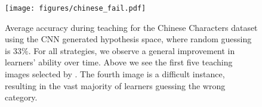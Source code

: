 \documentclass[../main.tex]{subfiles}
\begin{document}
\begin{figure}[h]
    \centering
    \texttt{[image: figures/chinese\_fail.pdf]}
    \caption{Average accuracy during teaching for the Chinese Characters dataset using the CNN generated hypothesis space, where random guessing is $33\%$. For all strategies, we observe a general improvement in learners' ability over time. Above we see the first five teaching images selected by \EXPLAIN. The fourth image is a difficult instance, resulting in the vast majority of learners guessing the wrong category.}
    \label{fig:chinese_fail}
    \vspace{-10pt}
\end{figure}
\end{document}
